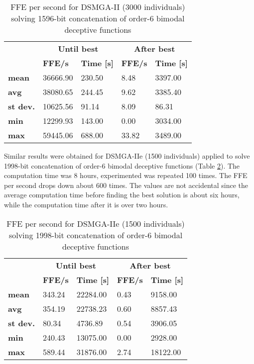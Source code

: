 \begin{table}[]
	\centering
	\caption{FFE per second for DSMGA-II (3000 individuals) solving 1596-bit concatenation of order-6 bimodal deceptive functions}
	\label{tab:100RunsForDSMGA2}
	\begin{tabular}{lllll}
		\toprule
		&  \multicolumn{2}{c}{\textbf{Until best}} & \multicolumn{2}{c}{\textbf{After best}}              \\
		& \textbf{FFE/s}    & \textbf{Time {[}s{]}} & \textbf{FFE/s} & \textbf{Time {[}s{]}} \\
		\midrule
		\textbf{mean}       & 36666.90 & 230.50       & 8.48  & 3397.00      \\
		\textbf{avg}        & 38080.65 & 244.45       & 9.62  & 3385.40      \\
		\textbf{st dev.}    & 10625.56 & 91.14        & 8.09  & 86.31        \\
		\textbf{min}        & 12299.93 & 143.00       & 0.00  & 3034.00      \\
		\textbf{max}        & 59445.06 & 688.00       & 33.82 & 3489.00     \\
		\bottomrule
	\end{tabular}
\end{table}

Similar results were obtained for DSMGA-IIe (1500 individuals) applied to solve 1998-bit concatenation of order-6 bimodal deceptive functions (Table \ref{tab:100RunsForDSMGA2e}). The computation time was 8 hours, experimented was repeated 100 times. The FFE per second drops down about 600 times. The values are not accidental since the average computation time before finding the best solution is about six hours, while the computation time after it is over two hours.\par


\begin{table}[]
	\centering
	\caption{FFE per second for DSMGA-IIe (1500 individuals) solving 1998-bit concatenation of order-6 bimodal deceptive functions}
	\label{tab:100RunsForDSMGA2e}
	\begin{tabular}{lllll}
		\toprule
		&  \multicolumn{2}{c}{\textbf{Until best}} & \multicolumn{2}{c}{\textbf{After best}}              \\
		& \textbf{FFE/s}    & \textbf{Time {[}s{]}} & \textbf{FFE/s} & \textbf{Time {[}s{]}} \\
		\midrule
		\textbf{mean}       & 343.24 & 22284.00     & 0.43  & 9158.00      \\
		\textbf{avg}        & 354.19 & 22738.23     & 0.60  & 8857.43      \\
		\textbf{st dev.}    & 80.34  & 4736.89      & 0.54  & 3906.05      \\
		\textbf{min}        & 240.43 & 13075.00     & 0.00  & 2928.00      \\
		\textbf{max}        & 589.44 & 31876.00     & 2.74  & 18122.00    \\
		\bottomrule
	\end{tabular}
\end{table}


